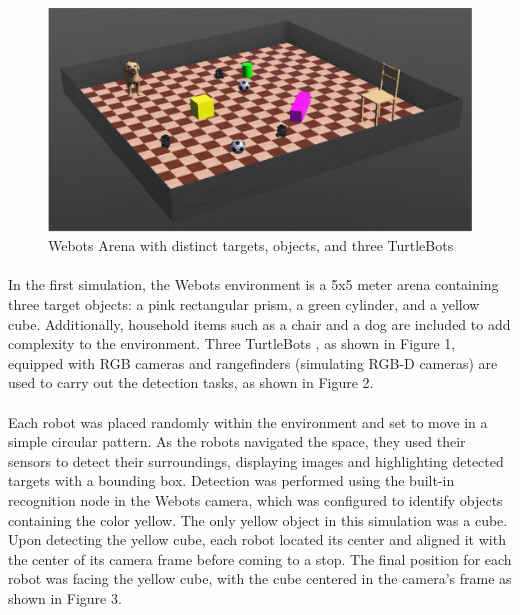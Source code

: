 \begin{figure}[H]
    \centering
    \includegraphics[width=0.9\linewidth]{assets/images/object_detection/Figure2.png}
    \caption{Webots Arena with distinct targets, objects, and three TurtleBots}
    \label{fig:object detection figure 2.} 
\end{figure}

\paragraph*{}
In the first simulation, the Webots environment is a 5x5 meter arena containing three target objects: a pink rectangular prism, a green cylinder, and a yellow cube. Additionally, household items such as a chair and a dog are included to add complexity to the environment. Three TurtleBots , as shown in Figure 1, equipped with RGB cameras and rangefinders (simulating RGB-D cameras) are used to carry out the detection tasks, as shown in Figure 2.

\paragraph*{}
Each robot was placed randomly within the environment and set to move in a simple circular pattern. As the robots navigated the space, they used their sensors to detect their surroundings, displaying images and highlighting detected targets with a bounding box. Detection was performed using the built-in recognition node in the Webots camera, which was configured to identify objects containing the color yellow. The only yellow object in this simulation was a cube. Upon detecting the yellow cube, each robot located its center and aligned it with the center of its camera frame before coming to a stop. The final position for each robot was facing the yellow cube, with the cube centered in the camera’s frame as shown in Figure 3.

